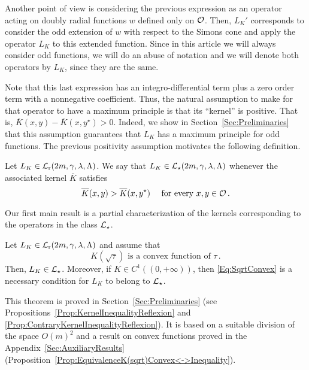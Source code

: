 Another point of view is considering the previous expression as an operator acting on doubly radial functions $w$ defined only on $\mathcal{O}$. Then, $L_K'$ corresponds to consider the odd extension of  $w$ with respect to the Simons cone and apply the operator $L_K$ to this extended function. Since in this article we will always consider odd functions, we will do an abuse of notation and we will denote both operators by $L_K$, since they are the same.

Note that this last expression has an integro-differential term plus a zero order term with a nonnegative coefficient. Thus, the natural assumption to make for that operator to have a maximum principle is that its ``kernel'' is positive. That is, $\overline{K}(x, y) - \overline{K}(x, y^\star)>0$. Indeed, we show in Section~\ref{Sec:Preliminaries} that this assumption guarantees that $L_K$ has a maximum principle for odd functions. The previous positivity assumption motivates the following definition.

\begin{definition}
	Let $L_K \in \mathcal{L}_{\mathrm{r}}(2m,\gamma,\lambda, \Lambda)$. We say that $L_K\in \mathcal{L}_\star (2m,\gamma,\lambda, \Lambda)$ whenever the associated kernel $\overline{K}$ satisfies
	\begin{equation}
		\label{Eq:KernelInequality}
		\overline{K}(x,y) > \overline{K}(x, y^\star) \quad \text{ for every }x,y \in \mathcal{O}\,.
	\end{equation}
\end{definition}

Our first main result is a partial characterization of the kernels corresponding to the operators in the class $\mathcal{L}_\star$.

\begin{theorem}
	\label{Th:CharacterizationLstar}
	Let $L_K \in \mathcal{L}_{\mathrm{r}}(2m,\gamma,\lambda, \Lambda)$ and assume that 
	\begin{equation}
		\label{Eq:SqrtConvex}	
		K(\sqrt{\tau}) \text{ is a convex function of }\tau\,.
	\end{equation}
	Then, $L_K\in \mathcal{L}_\star$. Moreover, if $K\in C^1((0,+\infty))$, then \eqref{Eq:SqrtConvex} is a necessary condition for $L_K$ to belong to $\mathcal{L}_\star$.
\end{theorem}

This theorem is proved in Section~\ref{Sec:Preliminaries} (see Propositions~\ref{Prop:KernelInequalityReflexion} and \ref{Prop:ContraryKernelInequalityReflexion}). It is based on a suitable division of the space $O(m)^2$ and a result on convex functions proved in the Appendix~\ref{Sec:AuxiliaryResults} (Proposition~\ref{Prop:EquivalenceK(sqrt)Convex<->Inequality}).



